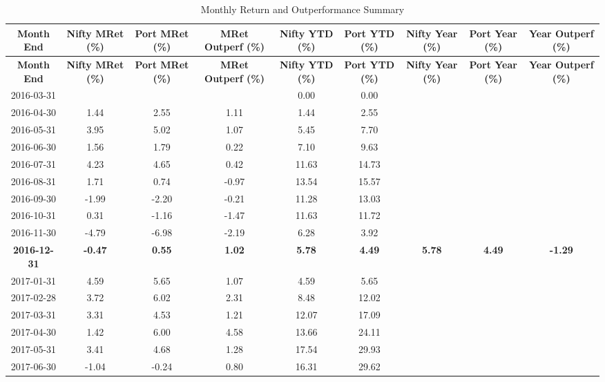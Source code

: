 \setlength{\tabcolsep}{3pt}
\renewcommand{\arraystretch}{1.05}
\footnotesize
\begin{longtable}{ccccccccc}
\caption{Monthly Return and Outperformance Summary} \\
\toprule
\textbf{Month End} & \textbf{Nifty MRet (\%)} & \textbf{Port MRet (\%)} & \textbf{MRet Outperf (\%)} & \textbf{Nifty YTD (\%)}\footnotemark[1] & \textbf{Port YTD (\%)}\footnotemark[1] & \textbf{Nifty Year (\%)}\footnotemark[2] & \textbf{Port Year (\%)}\footnotemark[2] & \textbf{Year Outperf (\%)} \\
\midrule
\endfirsthead
\toprule
\textbf{Month End} & \textbf{Nifty MRet (\%)} & \textbf{Port MRet (\%)} & \textbf{MRet Outperf (\%)} & \textbf{Nifty YTD (\%)}\footnotemark[1] & \textbf{Port YTD (\%)}\footnotemark[1] & \textbf{Nifty Year (\%)}\footnotemark[2] & \textbf{Port Year (\%)}\footnotemark[2] & \textbf{Year Outperf (\%)} \\
\midrule
\endhead
2016-03-31 &  &  &  & 0.00 & 0.00 &  &  &  \\
2016-04-30 & 1.44 & 2.55 & 1.11 & 1.44 & 2.55 &  &  &  \\
2016-05-31 & 3.95 & 5.02 & 1.07 & 5.45 & 7.70 &  &  &  \\
2016-06-30 & 1.56 & 1.79 & 0.22 & 7.10 & 9.63 &  &  &  \\
2016-07-31 & 4.23 & 4.65 & 0.42 & 11.63 & 14.73 &  &  &  \\
2016-08-31 & 1.71 & 0.74 & -0.97 & 13.54 & 15.57 &  &  &  \\
2016-09-30 & -1.99 & -2.20 & -0.21 & 11.28 & 13.03 &  &  &  \\
2016-10-31 & 0.31 & -1.16 & -1.47 & 11.63 & 11.72 &  &  &  \\
2016-11-30 & -4.79 & -6.98 & -2.19 & 6.28 & 3.92 &  &  &  \\
\textbf{2016-12-31} & \textbf{-0.47} & \textbf{0.55} & \textbf{1.02} & \textbf{5.78} & \textbf{4.49} & \textbf{5.78} & \textbf{4.49} & \textbf{-1.29} \\
\midrule
2017-01-31 & 4.59 & 5.65 & 1.07 & 4.59 & 5.65 &  &  &  \\
2017-02-28 & 3.72 & 6.02 & 2.31 & 8.48 & 12.02 &  &  &  \\
2017-03-31 & 3.31 & 4.53 & 1.21 & 12.07 & 17.09 &  &  &  \\
2017-04-30 & 1.42 & 6.00 & 4.58 & 13.66 & 24.11 &  &  &  \\
2017-05-31 & 3.41 & 4.68 & 1.28 & 17.54 & 29.93 &  &  &  \\
2017-06-30 & -1.04 & -0.24 & 0.80 & 16.31 & 29.62 &  &  &  \\

\end{longtable}
